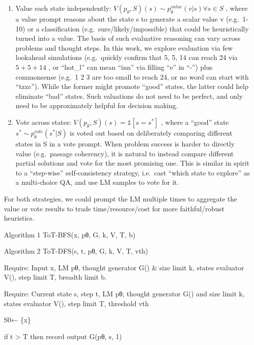 \documentclass[
]{article}
\providecommand{\tightlist}{%
  \setlength{\itemsep}{0pt}\setlength{\parskip}{0pt}}
\begin{document}
\begin{enumerate}
\def\labelenumi{(\alph{enumi})}
\tightlist
\item
  Value each state independently:
  \(V(p_{\theta}, S)(s) \sim p_{\theta}^{value}(v|s) \forall s \in S\) ,
  where a value prompt reasons about the state s to generate a scalar
  value v (e.g.~1-10) or a classification (e.g.~sure/likely/impossible)
  that could be heuristically turned into a value. The basis of such
  evaluative reasoning can vary across problems and thought steps. In
  this work, we explore evaluation via few lookahead simulations
  (e.g.~quickly confirm that 5, 5, 14 can reach 24 via \(5 + 5 + 14\) ,
  or ``hot\_l'' can mean ``inn'' via filling ``e'' in ``-'') plus
  commonsense (e.g.~1 2 3 are too small to reach 24, or no word can
  start with ``tzxc''). While the former might promote ``good'' states,
  the latter could help eliminate ``bad'' states. Such valuations do not
  need to be perfect, and only need to be approximately helpful for
  decision making.\\
\item
  Vote across states: \(V(p_{\theta}, S)(s) = \mathbb{1}[s = s^{*}]\) ,
  where a ``good'' state \(s^{*} \sim p_{\theta}^{vote}(s^{*}|S)\) is
  voted out based on deliberately comparing different states in S in a
  vote prompt. When problem success is harder to directly value
  (e.g.~passage coherency), it is natural to instead compare different
  partial solutions and vote for the most promising one. This is similar
  in spirit to a ``step-wise'' self-consistency strategy, i.e.~cast
  ``which state to explore'' as a multi-choice QA, and use LM samples to
  vote for it.
\end{enumerate}

For both strategies, we could prompt the LM multiple times to aggregate
the value or vote results to trade time/resource/cost for more
faithful/robust heuristics.

Algorithm 1 ToT-BFS(x, pθ, G, k, V, T, b)

Algorithm 2 ToT-DFS(s, t, pθ, G, k, V, T, vth)

Require: Input x, LM pθ, thought generator G() \& size limit k, states
evaluator V(), step limit T, breadth limit b.

Require: Current state s, step t, LM pθ, thought generator G() and size
limit k, states evaluator V(), step limit T, threshold vth

S0← \{x\}

if t \textgreater{} T then record output G(pθ, s, 1)
\end{document}
